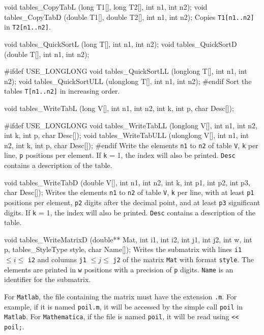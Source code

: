 void tables_CopyTabL (long T1[], long T2[], int n1, int n2);
void tables_CopyTabD (double T1[], double T2[], int n1, int n2);
\endcode
  \tab Copies {\tt T1[n1..n2]} in {\tt T2[n1..n2]}.
  \endtab
\code


void tables_QuickSortL (long T[], int n1, int n2);
void tables_QuickSortD (double T[], int n1, int n2);

#ifdef USE_LONGLONG
   void tables_QuickSortLL (longlong T[], int n1, int n2);
   void tables_QuickSortULL (ulonglong T[], int n1, int n2);
#endif
\endcode
 \tab Sort the tables {\tt T[n1..n2]} in increasing order.
 \endtab
\code


void tables_WriteTabL (long V[], int n1, int n2, int k, int p, char Desc[]);

#ifdef USE_LONGLONG
   void tables_WriteTabLL (longlong V[], int n1, int n2, int k, int p,
                           char Desc[]);
   void tables_WriteTabULL (ulonglong V[], int n1, int n2, int k, int p,
                            char Desc[]);
#endif
\endcode
 \tab  Write the elements {\tt n1} to {\tt n2} of table {\tt V},
  {\tt k} per line, {\tt p} positions per element.
  If  {\tt k} = 1, the index will also be printed. {\tt Desc}
  contains a description of the table.
 \endtab
\code


void tables_WriteTabD (double V[], int n1, int n2, int k, int p1, int p2,
                       int p3, char Desc[]);
\endcode
 \tab  Writes the elements {\tt n1} to {\tt n2} of table {\tt V},
  {\tt k} per line, with at least {\tt p1} positions per element,
  {\tt p2} digits after the decimal point, and at least  {\tt p3}
   significant digits.
   If {\tt k} = 1, the index
  will also be printed. {\tt Desc} contains a description of the table.
 \endtab
\code


void tables_WriteMatrixD (double** Mat, int i1, int i2, int j1, int j2,
                          int w, int p, tables_StyleType style,
                          char Name[]);
\endcode
 \tab Writes the submatrix with lines 
   {\tt i1} $\le i \le $ {\tt i2} and columns 
   {\tt j1} $\le j \le $ {\tt j2} of the matrix {\tt Mat} with format
   {\tt style}. The elements are printed in {\tt w}
   positions with a precision of {\tt p} digits. {\tt Name} is
   an identifier for the submatrix.
  
   For {\tt Matlab}, the file containing the matrix must have
   the extension {\tt .m}.
   For example, if it is named {\tt poil.m}, it will be accessed by the
   simple call {\tt poil} in {\tt Matlab}.
   For {\tt Mathematica}, if the file is named {\tt poil},
   it will be read using {\tt << poil;}.
 \endtab
\code


